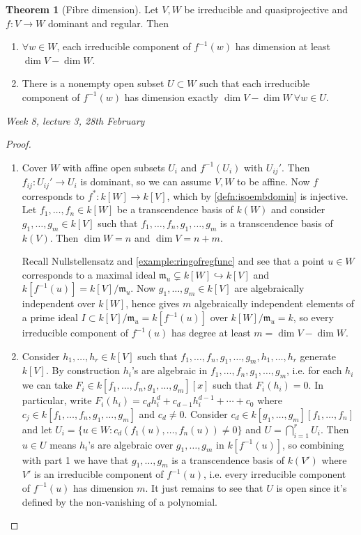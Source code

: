 \documentclass{article}
\newcommand{\m}{\mathfrak{m}}
\theoremstyle{definition}
\newtheorem{thm}[defn]{Theorem}
\begin{document}
\begin{thm}[Fibre dimension]
Let $V,W$ be irreducible and quasiprojective and $f:V\rightarrow W$ dominant and regular. Then
\begin{enumerate}
\item $\forall w\in W$, each irreducible component of $f^{-1}(w)$ has dimension at least $\dim V-\dim W$.
\item There is a nonempty open subset $U\subset W$ such that each irreducible component of $f^{-1}(w)$ has dimension exactly $\dim V-\dim W\ \forall w\in U$.
\end{enumerate}
\end{thm}

\begin{flushright}
\textit{Week 8, lecture 3, 28th February}
\end{flushright}

\begin{proof}
\begin{enumerate}
\item Cover $W$ with affine open subsets $U_i$ and $f^{-1}(U_i)$ with $U_{ij}'$. Then $f_{ij}:U_{ij}'\rightarrow U_i$ is dominant, so we can assume $V,W$ to be affine. Now $f$ corresponds to $f^\ast:k[W]\rightarrow k[V]$, which by \ref{defn:isoembdomin} is injective. Let $f_1,\ldots,f_n\in k[W]$ be a transcendence basis of $k(W)$ and consider $g_1,\ldots,g_m\in k[V]$ such that $f_1,\ldots,f_n,g_1,\ldots,g_m$ is a transcendence basis of $k(V)$. Then $\dim W=n$ and $\dim V=n+m$.

Recall Nullstellensatz and \ref{example:ringofregfunc} and see that a point $u\in W$ corresponds to a maximal ideal $\m_u\subsetneq k[W]\hookrightarrow k[V]$ and $k[f^{-1}(u)]=k[V]/\m_u$. Now $g_1,\ldots,g_m\in k[V]$ are algebraically independent over $k[W]$, hence gives $m$ algebraically independent elements of a prime ideal $I\subset k[V]/\m_u=k[f^{-1}(u)]$ over $k[W]/\m_u=k$, so every irreducible component of $f^{-1}(u)$ has degree at least $m=\dim V-\dim W$.
\item Consider $h_1,\ldots,h_r\in k[V]$ such that $f_1,\ldots,f_n,g_1,\ldots,g_m,h_1,\ldots,h_r$ generate $k[V]$. By construction $h_i$'s are algebraic in $f_1,\ldots,f_n,g_1,\ldots,g_m$, i.e. for each $h_i$ we can take $F_i\in k[f_1,\ldots,f_n,g_1,\ldots,g_m][x]$ such that $F_i(h_i)=0$. In particular, write $F_i(h_i)=c_dh_i^d+c_{d-1}h_i^{d-1}+\cdots+c_0$ where $c_j\in k[f_1,\ldots,f_n,g_1,\ldots,g_m]$ and $c_d\neq 0$. Consider $c_d\in k[g_1,\ldots,g_m][f_1,\ldots,f_n]$ and let $U_i=\{u\in W:c_d(f_1(u),\ldots,f_n(u))\neq 0\}$ and $U=\bigcap_{i=1}^rU_i$. Then $u\in U$ means $h_i$'s are algebraic over $g_1,\ldots,g_m$ in $k[f^{-1}(u)]$, so combining with part 1 we have that $g_1,\ldots,g_m$ is a transcendence basis of $k(V')$ where $V'$ is an irreducible component of $f^{-1}(u)$, i.e. every irreducible component of $f^{-1}(u)$ has dimension $m$. It just remains to see that $U$ is open since it's defined by the non-vanishing of a polynomial.
\end{enumerate}
\end{proof}
\end{document}
